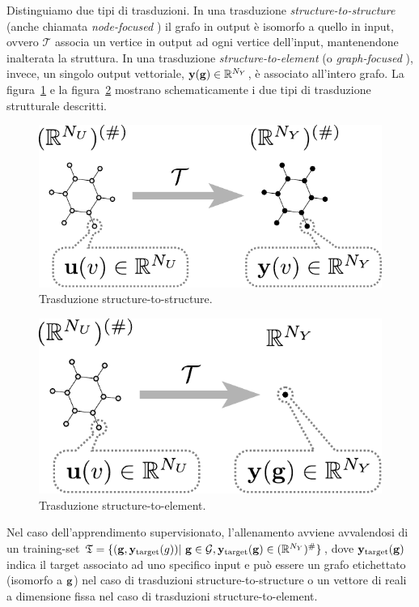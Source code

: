 Distinguiamo due tipi di trasduzioni. In una trasduzione \emph{structure-to-structure} (anche chiamata \emph{node-focused} \cite{Scarselli:GNN}) il grafo in output è isomorfo a quello in input, ovvero $\mathcal{T}$ associa un vertice in output ad ogni vertice dell'input, mantenendone inalterata la struttura. In una trasduzione \emph{structure-to-element} (o \emph{graph-focused} \cite{Scarselli:GNN}), invece, un singolo output vettoriale, $\mathbf{y}(\mathbf{g}) \in \mathbb{R}^{N_Y}$, è associato all'intero grafo. La figura~\ref{fig:intro:trasduzione-s2s} e la figura~\ref{fig:intro:trasduzione-s2e} mostrano schematicamente i due tipi di trasduzione strutturale descritti.

\begin{figure}[tbp]
\centering
\includegraphics[width=0.5\columnwidth]{img/T-str2str}
\medskip
\caption{Trasduzione structure-to-structure.}
\label{fig:intro:trasduzione-s2s}
\end{figure}

\begin{figure}[tbp]
\centering
\includegraphics[width=0.5\columnwidth]{img/T-str2el}
\medskip
\caption{Trasduzione structure-to-element.}
\label{fig:intro:trasduzione-s2e}
\end{figure}

Nel caso dell'apprendimento supervisionato, l'allenamento avviene avvalendosi di un training-set $\mathfrak{T} = \lbrace (\mathbf{g}, \mathbf{y}_\textup{target}(g)) \vert\ \mathbf{g} \in \mathcal{G}, \mathbf{y}_\textup{target}(\mathbf{g}) \in (\mathbb{R}^{N_Y})^{\#} \rbrace$, dove $\mathbf{y}_\textup{target}(\mathbf{g})$ indica il target associato ad uno specifico input e può essere un grafo etichettato (isomorfo a $\mathbf{g}$) nel caso di trasduzioni structure-to-structure o un vettore di reali a dimensione fissa nel caso di trasduzioni structure-to-element.


